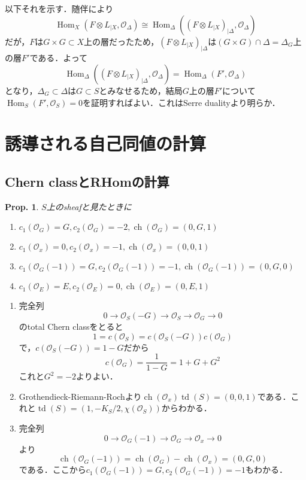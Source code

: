 \documentclass[uplatex,a4paper,11pt,dvipdfmx]{jsarticle}
\makeatletter
\theoremstyle{mystyle} %
\newtheorem{proposition}[theorem]{Prop.}
\renewenvironment{proof}[1][\proofname]{\par
 \pushQED{\qed}%
 \normalfont \topsep6\p@\@plus6\p@\relax
 \trivlist
 \item[\hskip\labelsep
 \itshape
 {\bf\underline{#1}}]\ignorespaces
}{%
 \popQED\endtrivlist\@endpefalse
}
\DeclareMathOperator{\Hom}{Hom}
\DeclareMathOperator{\ch}{ch}
\DeclareMathOperator{\td}{td}
\makeatother
\begin{document}
\begin{proof}
	以下それを示す．随伴により$$\Hom_X(F\otimes L_{|X}, \mathcal{O}_\Delta)\cong\Hom_\Delta((F\otimes L_{|X})_{|\Delta}, \mathcal{O}_\Delta)$$だが，$F$は$G \times G \subset X$上の層だったため，$(F\otimes L_{|X})_{|\Delta}$は$(G \times G) \cap \Delta = \Delta_G$上の層$F'$である．よって$$\Hom_\Delta((F\otimes L_{|X})_{|\Delta}, \mathcal{O}_\Delta)=\Hom_\Delta(F', \mathcal{O}_\Delta)$$となり，$\Delta_G \subset \Delta$は$G \subset S$とみなせるため，結局$G$上の層$F'$について$\Hom_S(F', \mathcal{O}_S)=0$を証明すればよい．これはSerre dualityより明らか．
\end{proof}

\section{誘導される自己同値の計算}
\subsection{Chern classとRHomの計算}
\begin{proposition}
	$S$上のsheafと見たときに
	\begin{enumerate}
		\item $c_1(\mathcal{O}_G) = G, c_2(\mathcal{O}_G) = -2, \ch(\mathcal{O}_G) = (0, G, 1)$

		\item $c_1(\mathcal{O}_x) = 0, c_2(\mathcal{O}_x) = -1, \ch(\mathcal{O}_x) = (0, 0, 1)$
		\item $c_1(\mathcal{O}_G(-1)) = G, c_2(\mathcal{O}_G(-1)) = -1, \ch(\mathcal{O}_G(-1)) = (0, G, 0)$
		\item $c_1(\mathcal{O}_E) = E, c_2(\mathcal{O}_E) = 0, \ch(\mathcal{O}_E) = (0, E, 1)$
	\end{enumerate}
\end{proposition}
\begin{proof}
	\begin{enumerate}
		\item 完全列$$0 \to \mathcal{O}_S(-G) \to \mathcal{O}_S \to \mathcal{O}_G \to 0$$のtotal Chern classをとると$$1 = c(\mathcal{O}_S) = c(\mathcal{O}_S(-G))c(\mathcal{O}_G)$$で，$c(\mathcal{O}_S(-G)) = 1-G$だから$$c(\mathcal{O}_G) = \frac{1}{1-G} = 1+G+G^2$$これと$G^2=-2$よりよい．

		\item Grothendieck-Riemann-Rochより$\ch(\mathcal{O}_x)\td(S) = (0, 0, 1)$である．これと$\td(S) = (1, -K_S/2, \chi(\mathcal{O}_S))$からわかる．
		\item 完全列$$0 \to \mathcal{O}_G(-1) \to \mathcal{O}_G \to \mathcal{O}_x \to 0$$より$$\ch( \mathcal{O}_G(-1)) = \ch(\mathcal{O}_G) - \ch(\mathcal{O}_x) = (0, G, 0)$$である．ここから$c_1(\mathcal{O}_G(-1)) = G, c_2(\mathcal{O}_G(-1)) = -1$もわかる．
	\end{enumerate}
\end{proof}
\end{document}
